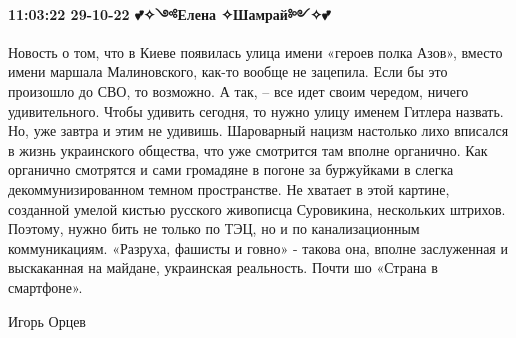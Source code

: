\paragraph{11:03:22 29-10-22 💕✧༺Елена ✧Шамрай༻✧💕}

Новость о том, что в Киеве появилась улица имени «героев полка Азов», вместо
имени маршала Малиновского, как-то вообще не зацепила. Если бы это произошло до
СВО, то возможно. А так, – все идет своим чередом, ничего удивительного. Чтобы
удивить сегодня, то нужно улицу именем Гитлера назвать. Но, уже завтра и этим
не удивишь. Шароварный нацизм настолько лихо вписался в жизнь украинского
общества, что уже смотрится там вполне органично. Как органично смотрятся и
сами громадяне в погоне за буржуйками в слегка декоммунизированном темном
пространстве. Не хватает в этой картине, созданной умелой кистью русского
живописца Суровикина, нескольких штрихов. Поэтому, нужно бить не только по ТЭЦ,
но и по канализационным коммуникациям. «Разруха, фашисты и говно» - такова она,
вполне заслуженная и выскаканная на майдане, украинская реальность. Почти шо
«Страна в смартфоне».

Игорь Орцев

